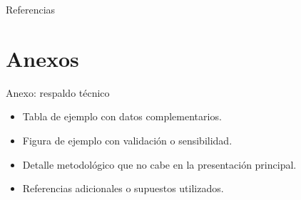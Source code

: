\begin{frame}[allowframebreaks]{Referencias}
  \nocite{*}
  \printbibliography
\end{frame}

\UCthanksframe[Gracias]

\appendix
\section{Anexos}

\begin{frame}{Anexo: respaldo técnico}
  \begin{itemize}
    \item Tabla de ejemplo con datos complementarios.
    \item Figura de ejemplo con validación o sensibilidad.
    \item Detalle metodológico que no cabe en la presentación principal.
    \item Referencias adicionales o supuestos utilizados.
  \end{itemize}
\end{frame}
